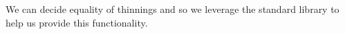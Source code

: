 We can decide equality of thinnings and so we leverage the standard library
to help us provide this functionality.

\begin{code}%
\>[0]\AgdaSpace{}%
\AgdaSymbol{:}\AgdaSpace{}%
\AgdaSpace{}%
\AgdaSymbol{(}\AgdaSpace{}%
\AgdaSpace{}%
\AgdaSymbol{)}\<%
\\
\>[0]%
\>[6]%
\>[9]%
\>[14]\AgdaSymbol{=}\AgdaSpace{}%
\AgdaSpace{}%
\<%
\\
\>[0]\AgdaSymbol{(}\AgdaSpace{}%
\AgdaSymbol{)}\AgdaSpace{}%
\AgdaSpace{}%
\AgdaSymbol{(}\AgdaSpace{}%
\AgdaSymbol{)}\AgdaSpace{}%
\AgdaSpace{}%
\AgdaSpace{}%
\AgdaSpace{}%
\<%
\\
\>[0]\AgdaSpace{}%
\AgdaSymbol{|}\AgdaSpace{}%
\AgdaSpace{}%
\AgdaSpace{}%
\AgdaSymbol{=}\AgdaSpace{}%
\AgdaSpace{}%
\<%
\\
\>[0]\AgdaSpace{}%
\AgdaSymbol{|}\AgdaSpace{}%
\AgdaSpace{}%
%
\>[15]\AgdaSymbol{=}\AgdaSpace{}%
\AgdaSpace{}%
\AgdaSpace{}%
\AgdaSymbol{\{}\AgdaSpace{}%
\AgdaSpace{}%
\AgdaSpace{}%
\AgdaSpace{}%
\AgdaSymbol{\})}\<%
\\
\>[0]\AgdaSymbol{(}\AgdaSpace{}%
\AgdaSymbol{)}\AgdaSpace{}%
\AgdaSpace{}%
\AgdaSymbol{(}\AgdaSpace{}%
\AgdaSymbol{)}\AgdaSpace{}%
\AgdaSymbol{=}\AgdaSpace{}%
\AgdaSpace{}%
\AgdaSpace{}%
\AgdaSymbol{\{()\})}\<%
\\
\>[0]\AgdaSymbol{(}\AgdaSpace{}%
\AgdaSymbol{)}\AgdaSpace{}%
\AgdaSpace{}%

\end{code}
